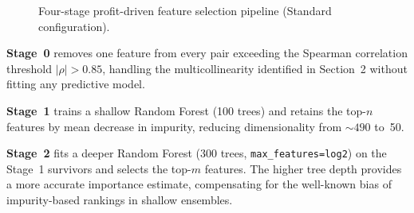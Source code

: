 \documentclass[11pt,a4paper]{article}
\begin{document}
\begin{figure}[H]
\centering
{}
\caption{Four-stage profit-driven feature selection pipeline (Standard configuration).}
\label{fig:pipeline}
\end{figure}

\textbf{Stage~0} removes one feature from every pair exceeding the Spearman correlation
threshold $|\rho|>0.85$, handling the multicollinearity identified in Section~2 without
fitting any predictive model.

\textbf{Stage~1} trains a shallow Random Forest (100 trees) and retains the top-$n$ features
by mean decrease in impurity, reducing dimensionality from ${\sim}490$ to~50.

\textbf{Stage~2} fits a deeper Random Forest (300 trees, \texttt{max\_features=log2}) on the
Stage~1 survivors and selects the top-$m$ features. The higher tree depth provides a more
accurate importance estimate, compensating for the well-known bias of impurity-based rankings
in shallow ensembles.
\end{document}
